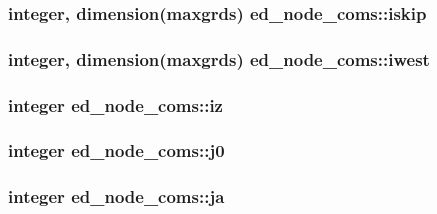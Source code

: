 \subsubsection[{iskip}]{\setlength{\rightskip}{0pt plus 5cm}integer, dimension(maxgrds) ed\+\_\+node\+\_\+coms\+::iskip}\label{namespaceed__node__coms_aa0b58de3ae40a5b1f807eeb1183579f9}
\hypertarget{namespaceed__node__coms_a799bc57708f0eade1e7c33bfed33deea}{}
\subsubsection[{iwest}]{\setlength{\rightskip}{0pt plus 5cm}integer, dimension(maxgrds) ed\+\_\+node\+\_\+coms\+::iwest}\label{namespaceed__node__coms_a799bc57708f0eade1e7c33bfed33deea}
\hypertarget{namespaceed__node__coms_a29c92ad4b60b88059dac8a8291b4553b}{}
\subsubsection[{iz}]{\setlength{\rightskip}{0pt plus 5cm}integer ed\+\_\+node\+\_\+coms\+::iz}\label{namespaceed__node__coms_a29c92ad4b60b88059dac8a8291b4553b}
\hypertarget{namespaceed__node__coms_a1767484e9dd38f3c6b443cd2202283a0}{}
\subsubsection[{j0}]{\setlength{\rightskip}{0pt plus 5cm}integer ed\+\_\+node\+\_\+coms\+::j0}\label{namespaceed__node__coms_a1767484e9dd38f3c6b443cd2202283a0}
\hypertarget{namespaceed__node__coms_a49471084e0370630b07db902c46c2ea8}{}
\subsubsection[{ja}]{\setlength{\rightskip}{0pt plus 5cm}integer ed\+\_\+node\+\_\+coms\+::ja}\label{namespaceed__node__coms_a49471084e0370630b07db902c46c2ea8}
\hypertarget{namespaceed__node__coms_afd254e42e760f8e20809b89c6862f940}{}
